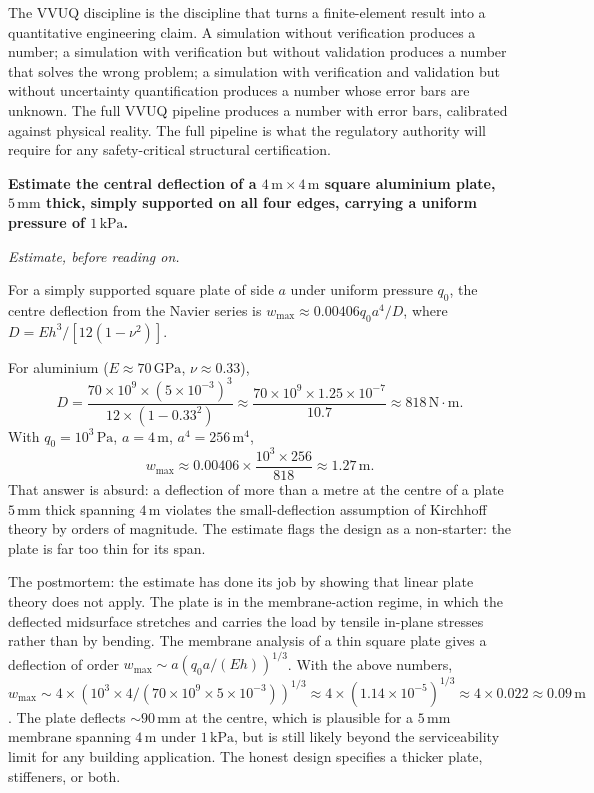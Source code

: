The VVUQ discipline is the discipline that turns a finite-element
result into a quantitative engineering claim. A simulation without
verification produces a number; a simulation with verification but
without validation produces a number that solves the wrong problem;
a simulation with verification and validation but without
uncertainty quantification produces a number whose error bars are
unknown. The full VVUQ pipeline produces a number with error bars,
calibrated against physical reality. The full pipeline is what
the regulatory authority will require for any safety-critical
structural certification.

\begin{estimation}
\textbf{Estimate the central deflection of a $4 \,\text{m} \times 4
\,\text{m}$ square aluminium plate, $5 \,\si{\milli\meter}$ thick,
simply supported on all four edges, carrying a uniform pressure of
$1\,\text{kPa}$.}

\smallskip
\textit{Estimate, before reading on.}

\smallskip
For a simply supported square plate of side $a$ under uniform
pressure $q_0$, the centre deflection from the Navier series is
$w_{\max} \approx 0.00406 q_0 a^4/D$, where $D = E h^3/[12(1-\nu^2)]$.

For aluminium ($E \approx 70\,\text{GPa}$, $\nu \approx 0.33$),
\[
D = \frac{70 \times 10^9 \times (5 \times 10^{-3})^3}{12 \times
(1 - 0.33^2)} \approx \frac{70 \times 10^9 \times 1.25 \times 10^{-7}}{
10.7} \approx 818\,\text{N}\cdot\text{m}.
\]
With $q_0 = 10^3\,\text{Pa}$, $a = 4\,\text{m}$, $a^4 = 256\,
\text{m}^4$,
\[
w_{\max} \approx 0.00406 \times \frac{10^3 \times 256}{818}
\approx 1.27\,\text{m}.
\]
That answer is absurd: a deflection of more than a metre at the
centre of a plate $5\,\text{mm}$ thick spanning $4\,\text{m}$ violates
the small-deflection assumption of Kirchhoff theory by orders of
magnitude. The estimate flags the design as a non-starter: the
plate is far too thin for its span.

The postmortem: the estimate has done its job by showing that
linear plate theory does not apply. The plate is in the
membrane-action regime, in which the deflected midsurface stretches
and carries the load by tensile in-plane stresses rather than by
bending. The membrane analysis of a thin square plate gives a
deflection of order $w_{\max} \sim a (q_0 a/(Eh))^{1/3}$. With the
above numbers, $w_{\max} \sim 4 \times (10^3 \times 4/(70 \times
10^9 \times 5 \times 10^{-3}))^{1/3} \approx 4 \times (1.14 \times
10^{-5})^{1/3} \approx 4 \times 0.022 \approx 0.09\,\text{m}$. The
plate deflects $\sim 90\,\si{\milli\meter}$ at the centre,
which is plausible for a $5\,\si{\milli\meter}$ membrane spanning
$4\,\text{m}$ under $1\,\text{kPa}$, but is still likely beyond the
serviceability limit for any building application. The honest
design specifies a thicker plate, stiffeners, or both.


\end{estimation}
